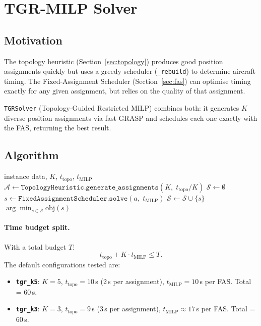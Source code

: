 \section{TGR-MILP Solver}
\label{sec:tgr-solver}

\subsection{Motivation}

The topology heuristic (Section~\ref{sec:topology}) produces good position
assignments quickly but uses a greedy scheduler (\texttt{\_rebuild}) to
determine aircraft timing.  The Fixed-Assignment Scheduler
(Section~\ref{sec:fas}) can optimise timing exactly for any given
assignment, but relies on the quality of that assignment.

\texttt{TGRSolver} (Topology-Guided Restricted MILP) combines both:
it generates $K$ diverse position assignments via fast GRASP and schedules
each one exactly with the FAS, returning the best result.

\subsection{Algorithm}

\begin{algorithm}[h]
\caption{TGRSolver}
\begin{algorithmic}[1]
\Require instance data, $K$, $t_{\mathrm{topo}}$, $t_{\mathrm{MILP}}$
\State $\mathcal{A} \leftarrow
    \texttt{TopologyHeuristic.generate\_assignments}(K,\;
    t_{\mathrm{topo}} / K)$
\State $\mathcal{S} \leftarrow \emptyset$
    \State $s \leftarrow \texttt{FixedAssignmentScheduler.solve}(a,\;
           t_{\mathrm{MILP}})$
    \State $\mathcal{S} \leftarrow \mathcal{S} \cup \{s\}$
\EndFor
\Return $\arg\min_{s \in \mathcal{S}} \mathrm{obj}(s)$
\end{algorithmic}
\end{algorithm}

\paragraph{Time budget split.}
With a total budget $T$:
\[
    t_{\mathrm{topo}} + K \cdot t_{\mathrm{MILP}} \leq T.
\]
The default configurations tested are:
\begin{itemize}[noitemsep]
    \item \textbf{\texttt{tgr\_k5}}: $K=5$, $t_{\mathrm{topo}}=10$\,s
          (2\,s per assignment), $t_{\mathrm{MILP}}=10$\,s per FAS.
          Total = 60\,s.
    \item \textbf{\texttt{tgr\_k3}}: $K=3$, $t_{\mathrm{topo}}=9$\,s
          (3\,s per assignment), $t_{\mathrm{MILP}}\approx17$\,s per FAS.
          Total = 60\,s.
\end{itemize}

